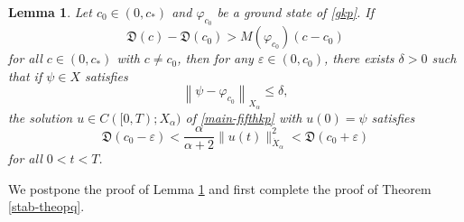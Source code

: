 \documentclass[10pt]{article}
\newcommand{\norm}[1]{\left\|   #1   \right\|}
\newcommand{\fd}{\mathfrak{D}}
\numberwithin{equation}{section}
\newtheorem{lemma}[theorem]{\quad Lemma}
\newcommand{\ff}{\varphi}
\newcommand{\al}{\alpha}
\begin{document}
	\begin{lemma}\label{lemma-st-3}
		Let $c_0\in(0,c_\ast)$ and $\ff_{c_0}$ be a ground state of \eqref{gkp}. If 
		\begin{equation}\label{assump-lem-1}
			\fd(c)-\fd(c_0)> M(\ff_{c_0})(c-c_0)
		\end{equation} 
		for all $c\in(0,c_\ast)$ with $c\neq c_0$, then for any $\varepsilon\in(0,c_0)$,  there exists $\delta>0$ such that if $\psi\in X$ satisfies 
		\begin{equation}
			\norm{\psi-\ff_{c_0}}_{X_\al}\leq\delta,
		\end{equation}
		the solution $u\in C([0,T);X_\al)$ of \eqref{main-fifthkp} with $u(0)=\psi$ satisfies
		\begin{equation}\label{claim-lem-1}
			\fd(c_0-\varepsilon)<\frac\al{\al+2}\|u(t)\|_{\dot{X}_\al}^2<\fd(c_0+\varepsilon)
		\end{equation}
		for all $0<t<T$.
	\end{lemma}
	We postpone the proof of Lemma \ref{lemma-st-3} and first complete the proof of Theorem \ref{stab-theopq}.
	
\end{document}
